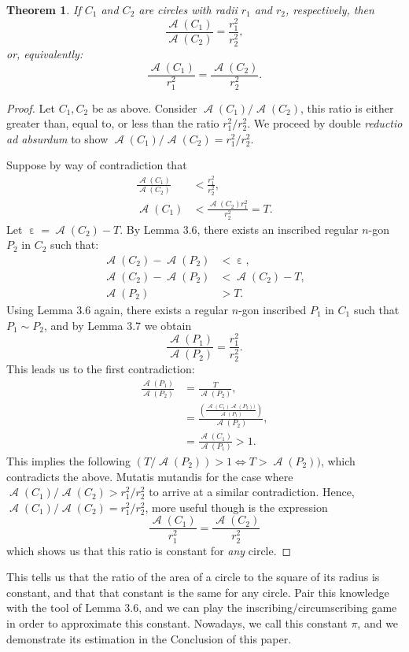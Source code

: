 \documentclass[letterpaper, 12pt]{amsart}
\DeclareMathOperator{\A}{\mathcal{A}}
\DeclareMathOperator{\ep}{\varepsilon}
\newtheorem{thm}{Theorem}[section]
\theoremstyle{definition}  %
\begin{document}
		\begin{thm}
		If $C_{1}$ and $C_{2}$ are circles with radii $r_{1}$ and $r_{2}$, respectively, then $$\frac{\A(C_{1})}{\A(C_{2})} = \frac{r_{1}^{2}}{r_{2}^{2}},$$ or, equivalently: $$\frac{\A(C_{1})}{r_{1}^{2}} = \frac{\A(C_{2})}{r_{2}^{2}}.$$
		\end{thm}
		\begin{proof}
		Let $C_{1}, C_{2}$ be as above.
		Consider $\A(C_{1})/\A(C_{2})$, this ratio is either greater than, equal to, or less than the ratio $r_{1}^{2}/r_{2}^{2}$.
		We proceed by double \textit{reductio ad absurdum} to show $\A(C_{1})/\A(C_{2}) = r_{1}^{2}/r_{2}^{2}$.

		Suppose by way of contradiction that 
			\begin{align*}
				\frac{\A(C_{1})}{\A(C_{2})} &< \frac{r_{1}^{2}}{r_{2}^{2}}, \\
				\A(C_{1}) &< \frac{\A(C_{2})r_{1}^{2}}{r_{2}^{2}} = T.
			\end{align*}
		Let $\ep = \A(C_{2}) - T$.
		By Lemma 3.6, there exists an inscribed regular $n$-gon $P_{2}$ in $C_{2}$ such that:
			\begin{align*}
			\A(C_{2}) - \A(P_{2}) &< \ep, \\
			\A(C_{2}) - \A(P_{2}) &< \A(C_{2}) - T, \\
			\A(P_{2}) &> T.
			\end{align*}
		Using Lemma 3.6 again, there exists a regular $n$-gon inscribed $P_{1}$ in $C_{1}$ such that $P_{1} \sim P_{2}$, and by Lemma 3.7 we obtain \[\frac{\A(P_{1})}{\A(P_{2})} = \frac{r_{1}^{2}}{r_{2}^{2}}.\]
		This leads us to the first contradiction:
			\begin{align*}
				\frac{\A(P_{1})}{\A(P_{2})} &= \frac{T}{\A(P_{2})}, \\
				&= \frac{\left( \tfrac{\A(C_{1})\A(P_{2}))}{\A(P_{1})} \right)}{\A(P_{2})}, \\
				&= \frac{\A(C_{1})}{\A(P_{1})} > 1.
			\end{align*}
		This implies the following $(T/\A(P_{2})) > 1 \iff T > \A(P_{2}))$, which contradicts the above.
		Mutatis mutandis for the case where $\A(C_{1})/\A(C_{2}) > r_{1}^{2}/r_{2}^{2}$ to arrive at a similar contradiction.
		Hence, $\A(C_{1})/\A(C_{2}) = r_{1}^{2}/r_{2}^{2}$, more useful though is the expression $$ \frac{\A(C_{1})}{r_{1}^{2}} = \frac{\A(C_{2})}{r_{2}^{2}}$$ which shows us that this ratio is constant for \textit{any} circle.			
		\end{proof}

		This tells us that the ratio of the area of a circle to the square of its radius is constant, and that that constant is the same for any circle.
		Pair this knowledge with the tool of Lemma 3.6, and we can play the inscribing/circumscribing game in order to approximate this constant.
		Nowadays, we call this constant $\pi$, and we demonstrate its estimation in the Conclusion of this paper.
\end{document}
